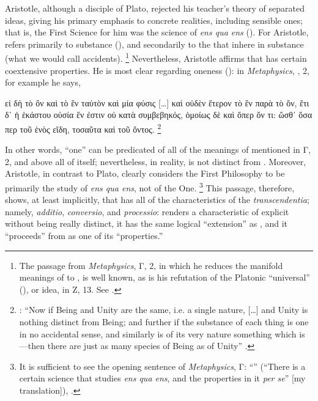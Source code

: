 Aristotle, although a disciple of Plato, rejected his teacher's theory of separated ideas, giving his primary emphasis to concrete realities, including sensible ones; that is, the First Science for him was the science of \emph{ens qua ens} (). For Aristotle,  refers primarily to substance (), and secondarily to the  that inhere in substance (what we would call accidents).%
%
\footnote{The passage from \emph{Metaphysics}, Γ, 2, in which he reduces the manifold meanings of  to , is well known, as is his refutation of the Platonic \enquote{universal} (), or idea, in Ζ, 13. See \cite[Γ, 2, 1003a33-1003b4, and Ζ, 13, 1038b35-1039a3]{aristotle:metaphysics}.}
%
Nevertheless, Aristotle affirms that  has certain coextensive properties. He is most clear regarding oneness (): in \emph{Metaphysics}, , 2, for example he says,
%
\begin{greekQuotation}
εἰ δὴ τὸ ὂν καὶ τὸ ἓν ταὐτὸν καὶ μία φύσις [\ldots] καὶ οὐδὲν ἕτερον τὸ ἓν παρὰ τὸ ὄν, ἔτι δ᾽ ἡ ἑκάστου οὐσία ἕν ἐστιν οὐ κατὰ συμβεβηκός, ὁμοίως δὲ καὶ ὅπερ ὄν τι: ὥσθ᾽ ὅσα περ τοῦ ἑνὸς εἴδη, τοσαῦτα καὶ τοῦ ὄντος.%
%
\footnote{\Cite[1003b23, 33-34]{aristotle:metaphysics}: \enquote{Now if Being and Unity are the same, i.e. a single nature, [\ldots] and Unity is nothing distinct from Being; and further if the substance of each thing is one in no accidental sense, and similarly is of its very nature something which is---then there are just as many species of Being as of Unity} \parencite[translation from][]{aristotle:metaphysics:en}.}
%
\end{greekQuotation}
%
In other words, \enquote{one} can be predicated of all of the meanings of  mentioned in Γ, 2, and above all of  itself; nevertheless, in reality,  is not distinct from . Moreover, Aristotle, in contrast to Plato, clearly considers the First Philosophy to be primarily the study of \emph{ens qua ens}, not of the One.%
%
\footnote{It is sufficient to see the opening sentence of \emph{Metaphysics}, Γ: \enquote{} (\enquote{There is a certain science that studies \emph{ens qua ens}, and the properties in it \emph{per se}} [my translation]), \cite[Γ, 1, 1003a21]{aristotle:metaphysics}.}
%
This passage, therefore, shows, at least implicitly, that  has all of the characteristics of the \emph{transcendentia}; namely, \emph{additio}, \emph{conversio}, and \emph{processio}:  renders a characteristic of  explicit without being really distinct, it has the same logical \enquote{extension} as , and it \enquote{proceeds} from  as one of its \enquote{properties.}

